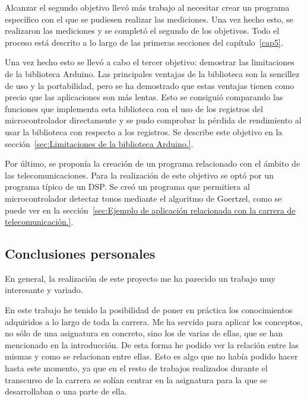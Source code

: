 Alcanzar el segundo objetivo llevó más trabajo al necesitar crear un programa específico con el que se pudiesen realizar las mediciones. Una vez hecho esto, se realizaron las mediciones y se completó el segundo de los objetivos. Todo el proceso está descrito a lo largo de las primeras secciones del capítulo~\ref{cap5}.

Una vez hecho esto se llevó a cabo el tercer objetivo: demostrar las limitaciones de la biblioteca Arduino. Las principales ventajas de la biblioteca son la sencillez de uso y la portabilidad, pero se ha demostrado que estas ventajas tienen como precio que las aplicaciones son más lentas. Esto se consiguió comparando las funciones que implementa esta biblioteca con el uso de los registros del microcontrolador directamente y se pudo comprobar la pérdida de rendimiento al usar la biblioteca con respecto a los registros.  Se describe este objetivo en la sección~\ref{sec:Limitaciones de la biblioteca Arduino.}.

Por último, se proponía la creación de un programa relacionado con el ámbito de las telecomunicaciones. Para la realización de este objetivo se optó por un programa típico de un DSP. Se creó un programa que permitiera al microcontrolador detectar tonos mediante el algoritmo de Goertzel, como se puede ver en la sección~\ref{sec:Ejemplo de aplicación relacionada con la carrera de telecomunicación.}.

\subsection{Conclusiones personales}

En general, la realización de este proyecto me ha parecido un trabajo muy interesante y variado.



En este trabajo he tenido la posibilidad de poner en práctica los conocimientos adquiridos a lo largo de toda la carrera. Me ha servido para aplicar los conceptos, no sólo de una asignatura en concreto, sino los de varias de ellas, que se han mencionado en la introducción. De esta forma he podido ver la relación entre las mismas y como se relacionan entre ellas. Esto es algo que no había podido hacer hasta este momento, ya que en el resto 
de trabajos realizados durante el transcurso de la carrera se solían centrar en la asignatura para la que se desarrollaban o una parte de ella.

